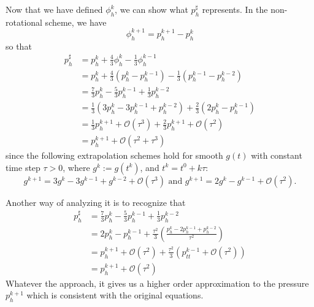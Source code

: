 \documentclass[letterpaper]{erdc}
\begin{document}
\begin{remark}
Now that we have defined $\phi_h^{k}$, we can show what $p_h^{\sharp}$ represents.  In the non-rotational scheme, we have
\begin{equation}
  \phi_h^{k+1} = p_h^{k+1} - p_h^{k}
\end{equation}
so that
  \begin{align}
    p_h^{\sharp} &= p_h^{k} + \frac{4}{3}\phi_h^{k} - \frac{1}{3}\phi_h^{k-1}\\
    &= p_h^{k} + \frac{4}{3}\left(p_h^{k} - p_h^{k-1}\right) - \frac{1}{3}\left(p_h^{k-1} - p_h^{k-2}\right)\\
    &= \frac{7}{3}p_h^{k} - \frac{5}{3}p_h^{k-1}+ \frac{1}{3}p_h^{k-2} \\
    &= \frac{1}{3}\left( 3p_h^{k} - 3p_h^{k-1} + p_h^{k-2} \right) + \frac{2}{3}\left(2p_h^{k} - p_h^{k-1}  \right)\\
    &= \frac{1}{3}p_h^{k+1} + \mathcal{O}(\tau^{3}) + \frac{2}{3} p_h^{k+1} + \mathcal{O}(\tau^{2})\\
    &= p_h^{k+1} + \mathcal{O}\left(\tau^2+\tau^3\right)
  \end{align}
  since the following extrapolation schemes hold for smooth $g(t)$ with constant time step $\tau>0$, where $g^{k} := g\left(t^{k}\right)$, and $t^k = t^0+k\tau$:
  \begin{equation}
    g^{k+1} = 3g^k - 3g^{k-1}+g^{k-2} + \mathcal{O}(\tau^3) \mbox{ and } g^{k+1}=2g^{k} - g^{k-1}+\mathcal{O}(\tau^2).
  \end{equation}
  
  Another way of analyzing it is to recognize that 
  \begin{align}
    p^{\sharp}_h &= \frac{7}{3}p_h^{k} - \frac{5}{3}p_h^{k-1}+ \frac{1}{3}p_h^{k-2} \\
    &= 2p_h^k - p_h^{k-1} + \frac{\tau^2}{3}\left(\frac{p_h^{k} - 2p^{k-1}_h + p_h^{k-2}}{\tau^2}  \right)\\
    &= p_h^{k+1} + \mathcal{O}(\tau^{2}) + \frac{\tau^2}{3}\left( p_{tt}^{k-1} + \mathcal{O}(\tau^{2}) \right)\\
    &= p_h^{k+1} + \mathcal{O}(\tau^2)
  \end{align}
  Whatever the approach, it gives us a higher order approximation to the pressure $p_h^{k+1}$ which is consistent with the original equations.
  

\end{remark}
\end{document}
